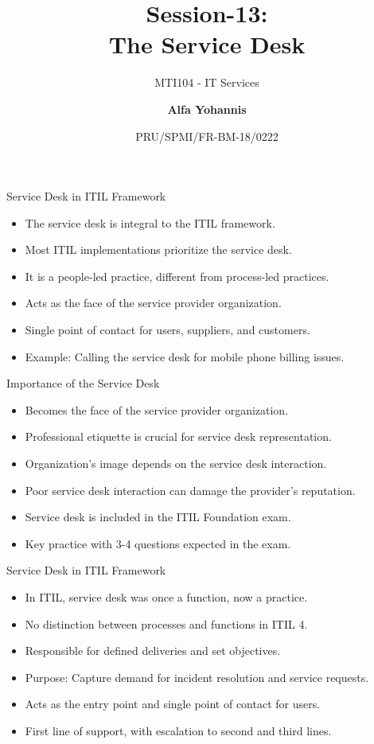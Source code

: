 \documentclass[aspectratio=169, table]{beamer}
\subtitle{MTI104 - IT Services}
\title{Session-13:\\\LARGE{The Service Desk\\}}
\date[Serial]{\scriptsize {PRU/SPMI/FR-BM-18/0222}}
\author[Pradita]{\small{\textbf{Alfa Yohannis}}}
\begin{document}
\frame{\titlepage}

\begin{frame}{Service Desk in ITIL Framework}
	\begin{itemize}
		\item The service desk is integral to the ITIL framework.
		\item Most ITIL implementations prioritize the service desk.
		\item It is a people-led practice, different from process-led practices.
		\item Acts as the face of the service provider organization.
		\item Single point of contact for users, suppliers, and customers.
		\item Example: Calling the service desk for mobile phone billing issues.
	\end{itemize}
\end{frame}

\begin{frame}{Importance of the Service Desk}
	\begin{itemize}
		\item Becomes the face of the service provider organization.
		\item Professional etiquette is crucial for service desk representation.
		\item Organization's image depends on the service desk interaction.
		\item Poor service desk interaction can damage the provider’s reputation.
		\item Service desk is included in the ITIL Foundation exam.
		\item Key practice with 3-4 questions expected in the exam.
	\end{itemize}
\end{frame}

\begin{frame}{Service Desk in ITIL Framework}
	\begin{itemize}
		\item In ITIL, service desk was once a function, now a practice.
		\item No distinction between processes and functions in ITIL 4.
		\item Responsible for defined deliveries and set objectives.
		\item Purpose: Capture demand for incident resolution and service requests.
		\item Acts as the entry point and single point of contact for users.
		\item First line of support, with escalation to second and third lines.
	\end{itemize}
\end{frame}
\end{document}
